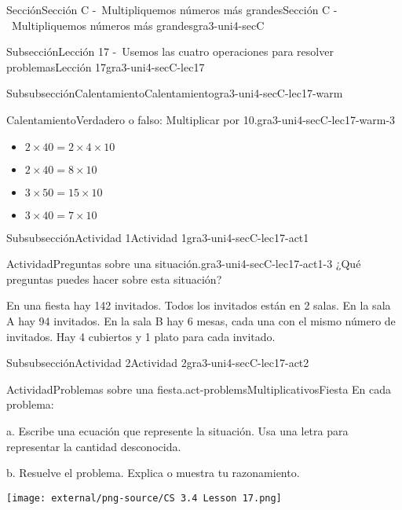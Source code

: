 \documentclass[twoside,10pt,]{article}
\begin{document}
\begin{sectionptx}{Sección}{Sección C -~Multipliquemos números más grandes}{}{Sección C -~Multipliquemos números más grandes}{}{}{gra3-uni4-secC}
\begin{subsectionptx}{Subsección}{Lección 17 -~Usemos las cuatro operaciones para resolver problemas}{}{Lección 17}{}{}{gra3-uni4-secC-lec17}
\begin{subsubsectionptx}{Subsubsección}{Calentamiento}{}{Calentamiento}{}{}{gra3-uni4-secC-lec17-warm}
\begin{exploration}{Calentamiento}{Verdadero o falso: Multiplicar por 10.}{gra3-uni4-secC-lec17-warm-3}
\begin{itemize}[label=\textbullet]
\item{}\(\displaystyle 2 \times 40 = 2 \times 4 \times 10\)%
\item{}\(\displaystyle 2 \times 40 = 8 \times 10\)%
\item{}\(\displaystyle 3 \times 50 = 15 \times 10\)%
\item{}\(\displaystyle 3 \times 40 = 7 \times 10\)%
\end{itemize}
\end{exploration}%
\end{subsubsectionptx}
%
%
\typeout{************************************************}
\typeout{************************************************}
%
\begin{subsubsectionptx}{Subsubsección}{Actividad 1}{}{Actividad 1}{}{}{gra3-uni4-secC-lec17-act1}
\begin{activity}{Actividad}{Preguntas sobre una situación.}{gra3-uni4-secC-lec17-act1-3}%
¿Qué preguntas puedes hacer sobre esta situación?%
\par
En una fiesta hay 142 invitados. Todos los invitados están en 2 salas. En la sala A hay 94 invitados. En la sala B hay 6 mesas, cada una con el mismo número de invitados. Hay 4 cubiertos y 1 plato para cada invitado.%
\end{activity}%
\end{subsubsectionptx}
%
%
\typeout{************************************************}
\typeout{************************************************}
%
\begin{subsubsectionptx}{Subsubsección}{Actividad 2}{}{Actividad 2}{}{}{gra3-uni4-secC-lec17-act2}
\begin{activity}{Actividad}{Problemas sobre una fiesta.}{act-problemsMultiplicativosFiesta}%
En cada problema:%
\begin{sidebyside}{2}{0}{0}{0}%
\begin{sbspanel}{0.6}%
a. Escribe una ecuación que represente la situación. Usa una letra para representar la cantidad desconocida.%
\par
b. Resuelve el problema. Explica o muestra tu razonamiento.%
\end{sbspanel}%
\begin{sbspanel}{0.4}%
\texttt{[image: external/png-source/CS 3.4 Lesson 17.png]}
\end{sbspanel}%
\end{sidebyside}%
%
\begin{enumerate}

\end{enumerate}
\end{activity}
\end{subsubsectionptx}
\end{subsectionptx}
\end{sectionptx}
\end{document}
